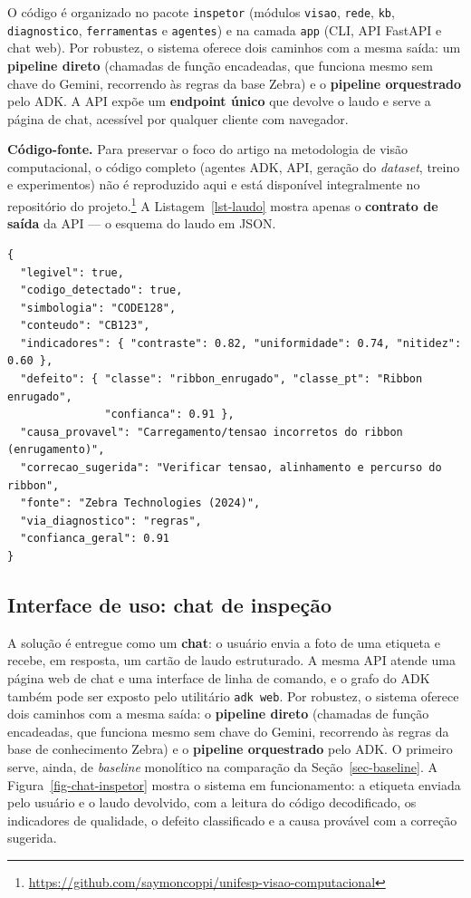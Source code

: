 \documentclass[
	article,			%
	11pt,				%
	oneside,			%
	a4paper,			%
	english,			%
	brazilian,			%
	sumario=tradicional
	]{abntex2}
\begin{document}
O código é organizado no pacote \texttt{inspetor} (módulos \texttt{visao},
\texttt{rede}, \texttt{kb}, \texttt{diagnostico}, \texttt{ferramentas} e
\texttt{agentes}) e na camada \texttt{app} (CLI, API FastAPI e chat web). Por
robustez, o sistema oferece dois caminhos com a mesma saída: um \textbf{pipeline
direto} (chamadas de função encadeadas, que funciona mesmo sem chave do Gemini,
recorrendo às regras da base Zebra) e o \textbf{pipeline orquestrado} pelo ADK. A
API expõe um \textbf{endpoint único} que devolve o laudo e serve a página de chat,
acessível por qualquer cliente com navegador.

\noindent\textbf{Código-fonte.} Para preservar o foco do artigo na metodologia de
visão computacional, o código completo (agentes ADK, API, geração do
\textit{dataset}, treino e experimentos) não é reproduzido aqui e está disponível
integralmente no repositório do projeto.\footnote{\url{https://github.com/saymoncoppi/unifesp-visao-computacional}}
A Listagem~\ref{lst-laudo} mostra apenas o \textbf{contrato de saída} da API --- o
esquema do laudo em JSON.

\begin{lstlisting}[language={},caption={Esquema do laudo devolvido pela API (JSON)},label=lst-laudo]
{
  "legivel": true,
  "codigo_detectado": true,
  "simbologia": "CODE128",
  "conteudo": "CB123",
  "indicadores": { "contraste": 0.82, "uniformidade": 0.74, "nitidez": 0.60 },
  "defeito": { "classe": "ribbon_enrugado", "classe_pt": "Ribbon enrugado",
               "confianca": 0.91 },
  "causa_provavel": "Carregamento/tensao incorretos do ribbon (enrugamento)",
  "correcao_sugerida": "Verificar tensao, alinhamento e percurso do ribbon",
  "fonte": "Zebra Technologies (2024)",
  "via_diagnostico": "regras",
  "confianca_geral": 0.91
}
\end{lstlisting}

\subsection{Interface de uso: chat de inspeção}

A solução é entregue como um \textbf{chat}: o usuário envia a foto de uma etiqueta e
recebe, em resposta, um cartão de laudo estruturado. A mesma API atende uma página web
de chat e uma interface de linha de comando, e o grafo do ADK também pode ser exposto
pelo utilitário \texttt{adk web}. Por robustez, o sistema oferece dois caminhos com a
mesma saída: o \textbf{pipeline direto} (chamadas de função encadeadas, que funciona
mesmo sem chave do Gemini, recorrendo às regras da base de conhecimento Zebra) e o
\textbf{pipeline orquestrado} pelo ADK. O primeiro serve, ainda, de \textit{baseline}
monolítico na comparação da Seção~\ref{sec-baseline}. A Figura~\ref{fig-chat-inspetor}
mostra o sistema em funcionamento: a etiqueta enviada pelo usuário e o laudo devolvido,
com a leitura do código decodificado, os indicadores de qualidade, o defeito
classificado e a causa provável com a correção sugerida.
\end{document}
